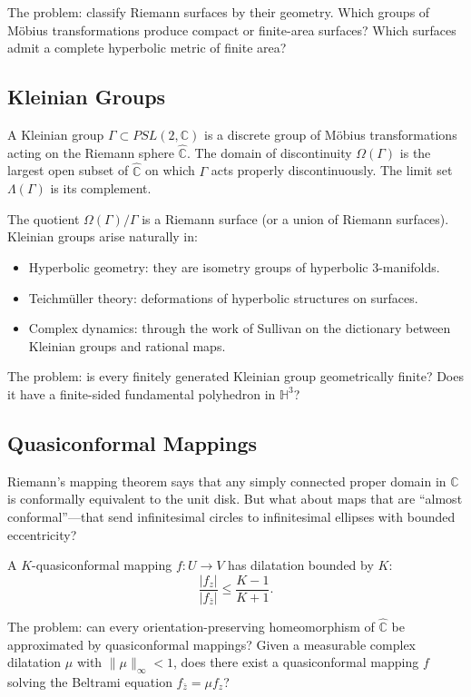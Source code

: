 The problem: classify Riemann surfaces by their geometry. Which groups of M\"{o}bius transformations produce compact or finite-area surfaces? Which surfaces admit a complete hyperbolic metric of finite area?

\subsection{Kleinian Groups}

A Kleinian group $\Gamma \subset PSL(2,\mathbb{C})$ is a discrete group of M\"{o}bius transformations acting on the Riemann sphere $\widehat{\mathbb{C}}$. The domain of discontinuity $\Omega(\Gamma)$ is the largest open subset of $\widehat{\mathbb{C}}$ on which $\Gamma$ acts properly discontinuously. The limit set $\Lambda(\Gamma)$ is its complement.

The quotient $\Omega(\Gamma)/\Gamma$ is a Riemann surface (or a union of Riemann surfaces). Kleinian groups arise naturally in:
\begin{itemize}
    \item Hyperbolic geometry: they are isometry groups of hyperbolic 3-manifolds.
    \item Teichm{\"u}ller theory: deformations of hyperbolic structures on surfaces.
    \item Complex dynamics: through the work of Sullivan on the dictionary between Kleinian groups and rational maps.
\end{itemize}

The problem: is every finitely generated Kleinian group geometrically finite? Does it have a finite-sided fundamental polyhedron in $\mathbb{H}^3$?

\subsection{Quasiconformal Mappings}

Riemann's mapping theorem says that any simply connected proper domain in $\mathbb{C}$ is conformally equivalent to the unit disk. But what about maps that are ``almost conformal''---that send infinitesimal circles to infinitesimal ellipses with bounded eccentricity?

A $K$-quasiconformal mapping $f: U \to V$ has dilatation bounded by $K$:
\[
\frac{|f_z|}{|f_{\bar z}|} \leq \frac{K-1}{K+1}.
\]

The problem: can every orientation-preserving homeomorphism of $\widehat{\mathbb{C}}$ be approximated by quasiconformal mappings? Given a measurable complex dilatation $\mu$ with $\|\mu\|_\infty < 1$, does there exist a quasiconformal mapping $f$ solving the Beltrami equation $f_{\bar z} = \mu f_z$?

